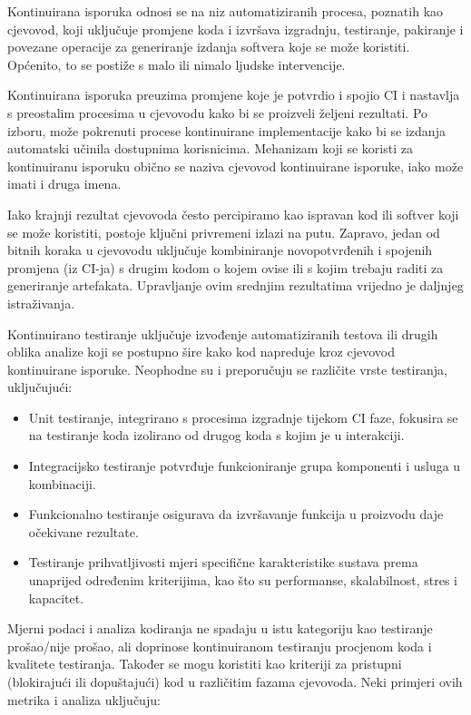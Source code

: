 \documentclass[a4paper,12pt,oneside]{article}
\begin{document}
Kontinuirana isporuka odnosi se na niz automatiziranih procesa, poznatih kao cjevovod, koji uključuje promjene koda i izvršava izgradnju, testiranje, pakiranje i povezane operacije za generiranje izdanja softvera koje se može koristiti. Općenito, to se postiže s malo ili nimalo ljudske intervencije.

Kontinuirana isporuka preuzima promjene koje je potvrdio i spojio CI i nastavlja s preostalim procesima u cjevovodu kako bi se proizveli željeni rezultati. Po izboru, može pokrenuti procese kontinuirane implementacije kako bi se izdanja automatski učinila dostupnima korisnicima. Mehanizam koji se koristi za kontinuiranu isporuku obično se naziva cjevovod kontinuirane isporuke, iako može imati i druga imena.

Iako krajnji rezultat cjevovoda često percipiramo kao ispravan kod ili softver koji se može koristiti, postoje ključni privremeni izlazi na putu. Zapravo, jedan od bitnih koraka u cjevovodu uključuje kombiniranje novopotvrđenih i spojenih promjena (iz CI-ja) s drugim kodom o kojem ovise ili s kojim trebaju raditi za generiranje artefakata. Upravljanje ovim srednjim rezultatima vrijedno je daljnjeg istraživanja.

Kontinuirano testiranje uključuje izvođenje automatiziranih testova ili drugih oblika analize koji se postupno šire kako kod napreduje kroz cjevovod kontinuirane isporuke. Neophodne su i preporučuju se različite vrste testiranja, uključujući:

\begin{itemize}
\item Unit testiranje, integrirano s procesima izgradnje tijekom CI faze, fokusira se na testiranje koda izolirano od drugog koda s kojim je u interakciji.
\item Integracijsko testiranje potvrđuje funkcioniranje grupa komponenti i usluga u kombinaciji.
\item Funkcionalno testiranje osigurava da izvršavanje funkcija u proizvodu daje očekivane rezultate.
\item Testiranje prihvatljivosti mjeri specifične karakteristike sustava prema unaprijed određenim kriterijima, kao što su performanse, skalabilnost, stres i kapacitet.
\end{itemize}

Mjerni podaci i analiza kodiranja ne spadaju u istu kategoriju kao testiranje prošao/nije prošao, ali doprinose kontinuiranom testiranju procjenom koda i kvalitete testiranja. Također se mogu koristiti kao kriteriji za pristupni (blokirajući ili dopuštajući) kod u različitim fazama cjevovoda. Neki primjeri ovih metrika i analiza uključuju:
\end{document}
